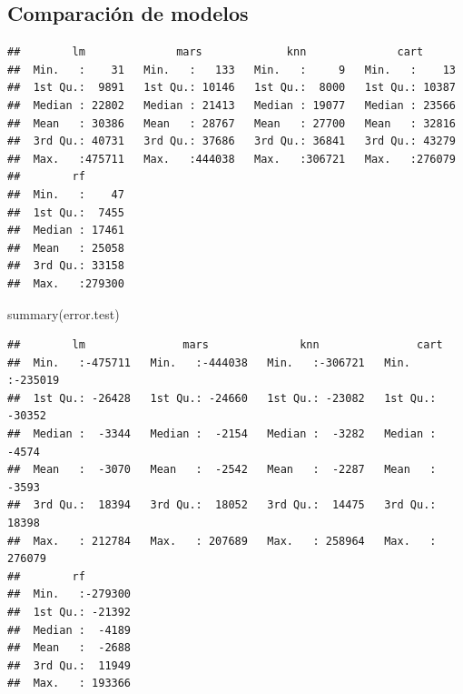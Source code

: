 \documentclass[
]{article}
\newenvironment{Shaded}{\begin{snugshade}}{\end{snugshade}}
\newcommand{\AttributeTok}[1]{\textcolor[rgb]{0.77,0.63,0.00}{#1}}
\newcommand{\FunctionTok}[1]{\textcolor[rgb]{0.00,0.00,0.00}{#1}}
\newcommand{\NormalTok}[1]{#1}
\newcommand{\OtherTok}[1]{\textcolor[rgb]{0.56,0.35,0.01}{#1}}
\newcommand{\SpecialCharTok}[1]{\textcolor[rgb]{0.00,0.00,0.00}{#1}}
\begin{document}
\hypertarget{comparaciuxf3n-de-modelos}{%
\subsection{Comparación de modelos}\label{comparaciuxf3n-de-modelos}}

\begin{Shaded}
\end{Shaded}

\begin{verbatim}
##        lm              mars             knn              cart       
##  Min.   :    31   Min.   :   133   Min.   :     9   Min.   :    13  
##  1st Qu.:  9891   1st Qu.: 10146   1st Qu.:  8000   1st Qu.: 10387  
##  Median : 22802   Median : 21413   Median : 19077   Median : 23566  
##  Mean   : 30386   Mean   : 28767   Mean   : 27700   Mean   : 32816  
##  3rd Qu.: 40731   3rd Qu.: 37686   3rd Qu.: 36841   3rd Qu.: 43279  
##  Max.   :475711   Max.   :444038   Max.   :306721   Max.   :276079  
##        rf        
##  Min.   :    47  
##  1st Qu.:  7455  
##  Median : 17461  
##  Mean   : 25058  
##  3rd Qu.: 33158  
##  Max.   :279300
\end{verbatim}

\begin{Shaded}
\begin{Highlighting}[]
\FunctionTok{summary}\NormalTok{(error.test)}
\end{Highlighting}
\end{Shaded}

\begin{verbatim}
##        lm               mars              knn               cart        
##  Min.   :-475711   Min.   :-444038   Min.   :-306721   Min.   :-235019  
##  1st Qu.: -26428   1st Qu.: -24660   1st Qu.: -23082   1st Qu.: -30352  
##  Median :  -3344   Median :  -2154   Median :  -3282   Median :  -4574  
##  Mean   :  -3070   Mean   :  -2542   Mean   :  -2287   Mean   :  -3593  
##  3rd Qu.:  18394   3rd Qu.:  18052   3rd Qu.:  14475   3rd Qu.:  18398  
##  Max.   : 212784   Max.   : 207689   Max.   : 258964   Max.   : 276079  
##        rf         
##  Min.   :-279300  
##  1st Qu.: -21392  
##  Median :  -4189  
##  Mean   :  -2688  
##  3rd Qu.:  11949  
##  Max.   : 193366
\end{verbatim}
\end{document}
